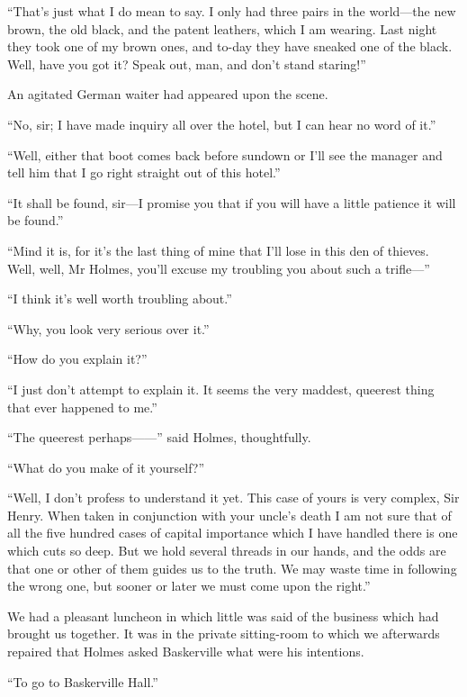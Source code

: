 \documentclass[paper=5.5in:8.5in,BCOR=7mm,twoside,DIV=calc,12pt,usegeometry,openany,chapterprefix,endperiod]{scrbook} %
\begin{document}
\enquote{That's just what I do mean to say. I only had three pairs in the world\nobreakdash---the new brown, the old black, and the patent leathers, which I am wearing. Last night they took one of my brown ones, and to-day they have sneaked one of the black. Well, have you got it? Speak out, man, and don't stand staring!}

An agitated German waiter had appeared upon the scene.

\enquote{No, sir; I have made inquiry all over the hotel, but I can hear no word of it.}

\enquote{Well, either that boot comes back before sundown or I'll see the manager and tell him that I go right straight out of this hotel.}

\enquote{It shall be found, sir\nobreakdash---I promise you that if you will have a little patience it will be found.}

\enquote{Mind it is, for it's the last thing of mine that I'll lose in this den of thieves. Well, well, Mr Holmes, you'll excuse my troubling you about such a trifle\nobreakdash---}

\enquote{I think it's well worth troubling about.}

\enquote{Why, you look very serious over it.}

\enquote{How do you explain it?}

\enquote{I just don't attempt to explain it. It seems the very maddest, queerest thing that ever happened to me.}

\enquote{The queerest perhaps\nobreakdash---\nobreakdash---} said Holmes, thoughtfully.

\enquote{What do you make of it yourself?}

\enquote{Well, I don't profess to understand it yet. This case of yours is very complex, Sir Henry. When taken in conjunction with your uncle's death I am not sure that of all the five hundred cases of capital importance which I have handled there is one which cuts so deep. But we hold several threads in our hands, and the odds are that one or other of them guides us to the truth. We may waste time in following the wrong one, but sooner or later we must come upon the right.}

We had a pleasant luncheon in which little was said of the business which had brought us together. It was in the private sitting-room to which we afterwards repaired that Holmes asked Baskerville what were his intentions.

\enquote{To go to Baskerville Hall.}
\end{document}
